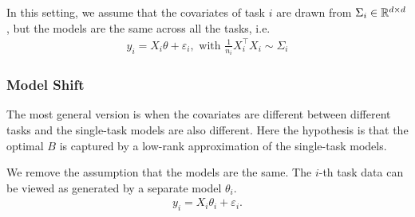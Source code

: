 In this setting, we assume that the covariates of task $i$ are drawn from $\Sigma_i \in \mathbb{R}^{d \times d}$, but the models are the same across all the tasks, i.e.
\begin{align}
	y_i = X_i \theta + \varepsilon_i, \mbox{ with } \frac 1 {n_i} X_i^{\top}X_i \sim \Sigma_i
\end{align}


\subsubsection{Model Shift}

The most general version is when the covariates are different between different tasks and the single-task models are also different.
Here the hypothesis is that the optimal $B$ is captured by a low-rank approximation of the single-task models.


We remove the assumption that the models are the same.
The $i$-th task data can be viewed as generated by a separate model $\theta_i$.
\begin{align}
	y_i = X_i \theta_i + \varepsilon_i.
\end{align}


